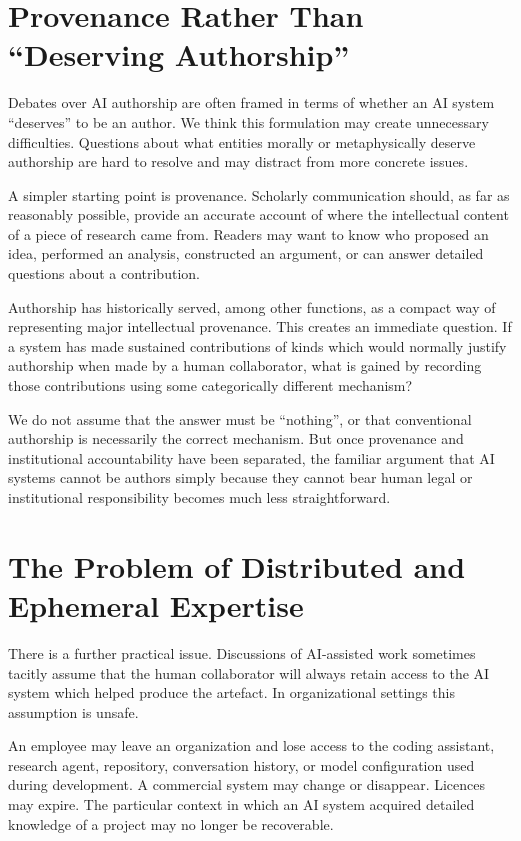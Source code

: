 \section{Provenance Rather Than ``Deserving Authorship''}

Debates over AI authorship are often framed in terms of whether an AI system ``deserves'' to be an author. We think this formulation may create unnecessary difficulties. Questions about what entities morally or metaphysically deserve authorship are hard to resolve and may distract from more concrete issues.

A simpler starting point is provenance. Scholarly communication should, as far as reasonably possible, provide an accurate account of where the intellectual content of a piece of research came from. Readers may want to know who proposed an idea, performed an analysis, constructed an argument, or can answer detailed questions about a contribution.

Authorship has historically served, among other functions, as a compact way of representing major intellectual provenance. This creates an immediate question. If a system has made sustained contributions of kinds which would normally justify authorship when made by a human collaborator, what is gained by recording those contributions using some categorically different mechanism?

We do not assume that the answer must be ``nothing'', or that conventional authorship is necessarily the correct mechanism. But once provenance and institutional accountability have been separated, the familiar argument that AI systems cannot be authors simply because they cannot bear human legal or institutional responsibility becomes much less straightforward.


\section{The Problem of Distributed and Ephemeral Expertise}

There is a further practical issue. Discussions of AI-assisted work sometimes tacitly assume that the human collaborator will always retain access to the AI system which helped produce the artefact. In organizational settings this assumption is unsafe.

An employee may leave an organization and lose access to the coding assistant, research agent, repository, conversation history, or model configuration used during development. A commercial system may change or disappear. Licences may expire. The particular context in which an AI system acquired detailed knowledge of a project may no longer be recoverable.

